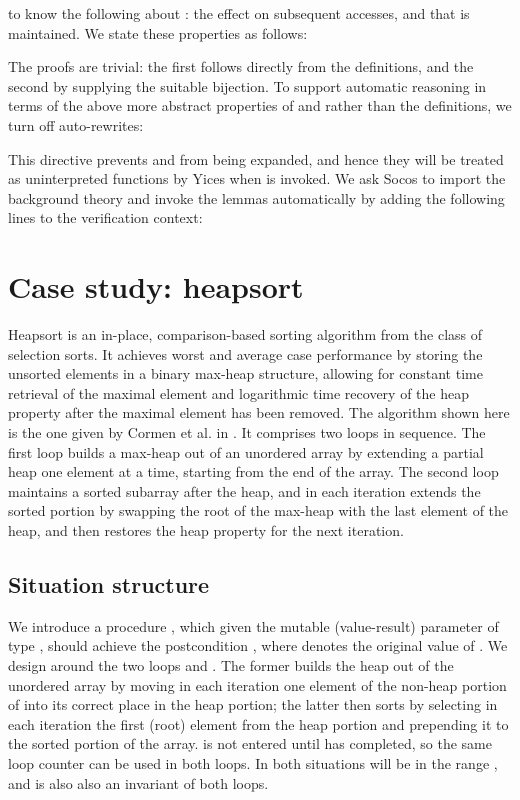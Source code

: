 \documentclass[english,submission]{eptcs}
\begin{document}
to know the following about : the effect on subsequent
accesses, and that  is maintained. We state these
properties as follows:
\begin{quote}
\noindent 
\end{quote}
\noindent The proofs are trivial: the first follows directly
from the definitions, and the second by supplying the suitable bijection.
To support automatic reasoning in terms of the above more
abstract properties of  and  rather
than the definitions, we turn off auto-rewrites:
\begin{quote}

\end{quote}
\noindent This directive prevents  and 
from being expanded, and hence they will be treated as uninterpreted
functions by Yices when  is invoked. We ask Socos
to import the background theory and invoke the lemmas automatically
by adding the following lines to the verification context:
\begin{quote}
\noindent 
\end{quote}

\section{Case study: heapsort\label{sec:Example:Heapsort}}

Heapsort is an in-place, comparison-based
sorting algorithm from the class of selection sorts. It achieves 
worst and average case performance by storing the unsorted elements
in a binary max-heap structure, allowing for constant time retrieval
of the maximal element and logarithmic time recovery of the heap property
after the maximal element has been removed. The algorithm shown here
is the one given by Cormen et al. in \cite[Ch. 6]{580470}. It comprises
two loops in sequence. The first loop builds a max-heap out of an
unordered array by extending a partial heap one element at a time,
starting from the end of the array. The second loop maintains a sorted
subarray after the heap, and in each iteration extends the sorted
portion by swapping the root of the max-heap with the last element
of the heap, and then restores the heap property for the next iteration.


\subsection{Situation structure}

We introduce a procedure , which given the mutable
(value-result) parameter  of type ,
should achieve the postcondition ,
where  denotes the original value of .
We design  around the two loops 
and . The former builds the heap out of the unordered
array  by moving in each iteration one element of the
non-heap portion of  into its correct place in the heap
portion; the latter then sorts  by selecting in each
iteration the first (root) element from the heap portion and prepending
it to the sorted portion of the array.  is not
entered until  has completed, so the same loop
counter  can be used in both loops. In both situations
 will be in the range , and 
is also also an invariant of both loops. 
\end{document}
